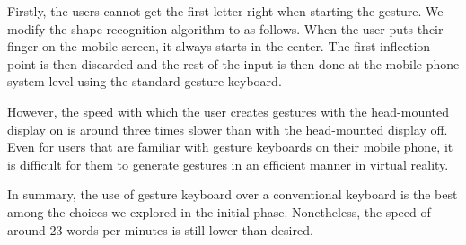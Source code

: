Firstly, the users cannot get the first letter right when starting the gesture.  We modify the shape recognition algorithm to as follows.  When the user puts their finger on the mobile screen, it always starts in the center.
The first inflection point is then discarded and the rest of the input is then done at the mobile phone system level using the standard gesture keyboard.

However, the speed with which the user creates gestures with the head-mounted display on is around three times slower than with the head-mounted display off.
Even for users that are familiar with gesture keyboards on their mobile phone, it is difficult for them to generate gestures in an efficient manner in virtual reality.

In summary, the use of gesture keyboard over a conventional keyboard is the best among the choices we explored in the initial phase.
Nonetheless, the speed of around 23 words per minutes is still lower than desired.



